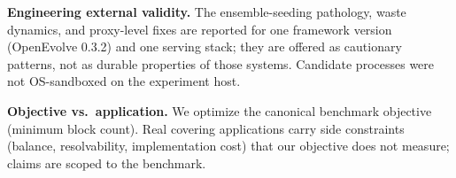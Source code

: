 \textbf{Engineering external validity.} The ensemble-seeding
pathology, waste dynamics, and proxy-level fixes are reported for one
framework version (OpenEvolve 0.3.2) and one serving stack; they are
offered as cautionary patterns, not as durable properties of those
systems. Candidate processes were not OS-sandboxed on the experiment
host.

\textbf{Objective vs.\ application.} We optimize the canonical
benchmark objective (minimum block count). Real covering
applications carry side constraints (balance, resolvability,
implementation cost) that our objective does not measure; claims are
scoped to the benchmark.
